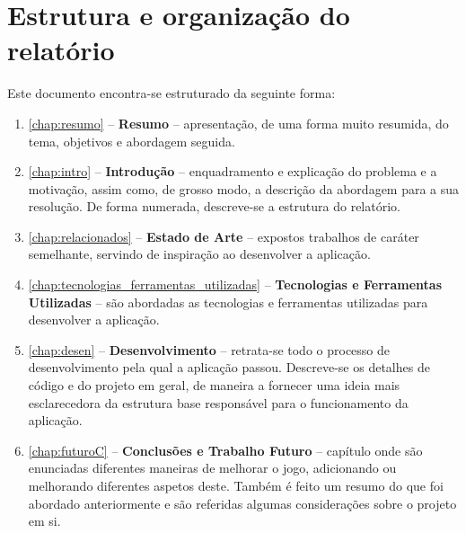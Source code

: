 \clearpage

\section{Estrutura e organização do relatório}
\label{sec:ODL}

Este documento encontra-se estruturado da seguinte forma:
\begin{enumerate}
\item \autoref{chap:resumo} -- \textbf{Resumo} -- apresentação, de uma forma muito resumida, do tema, objetivos e abordagem seguida.

\item \autoref{chap:intro} -- \textbf{Introdução} -- enquadramento e  explicação do problema e a motivação, assim como, de grosso modo, a descrição da abordagem para a sua resolução.  De forma numerada, descreve-se a estrutura do relatório.

\item \autoref{chap:relacionados} -- \textbf{Estado de Arte} -- expostos trabalhos de caráter semelhante, servindo de inspiração ao desenvolver a aplicação.

\item \autoref{chap:tecnologias_ferramentas_utilizadas} -- \textbf{Tecnologias e Ferramentas Utilizadas} --  são abordadas as tecnologias e ferramentas utilizadas para desenvolver a aplicação.

\item \autoref{chap:desen} -- \textbf{Desenvolvimento} -- retrata-se todo o processo de desenvolvimento pela qual a aplicação passou. Descreve-se os detalhes de código e do projeto em geral, de maneira a fornecer uma ideia mais esclarecedora da estrutura base responsável para o funcionamento da aplicação. 

\item \autoref{chap:futuroC} -- \textbf{Conclusões e Trabalho Futuro} -- capítulo onde são enunciadas diferentes maneiras de melhorar o jogo, adicionando ou melhorando diferentes aspetos deste. Também é feito um resumo do que foi abordado anteriormente e são referidas algumas considerações sobre o projeto em si.

\end{enumerate}

